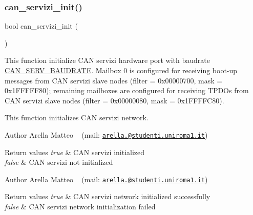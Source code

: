 \mbox{\label{group___c_a_n__servizi__group_ga2d29bd107e96ae1986e8874f004ffc84}} 
\subsubsection{\texorpdfstring{can\+\_\+servizi\+\_\+init()}{can\_servizi\_init()}}
{\footnotesize\ttfamily bool can\+\_\+servizi\+\_\+init (\begin{DoxyParamCaption}{ }\end{DoxyParamCaption})}



This function initialize C\+AN servizi hardware port with baudrate \mbox{\hyperlink{group___common__defines__group_ga2a5e84dfc7fa972b75e7ddbc6cc52a45}{C\+A\+N\+\_\+\+S\+E\+R\+V\+\_\+\+B\+A\+U\+D\+R\+A\+TE}}. Mailbox 0 is configured for receiving boot-\/up messages from C\+AN servizi slave nodes (filter = 0x00000700, mask = 0x1\+F\+F\+F\+F\+F80); remaining mailboxes are configured for receiving T\+P\+D\+Os from C\+AN servizi slave nodes (filter = 0x00000080, mask = 0x1\+F\+F\+F\+F\+C80). 

This function initializes C\+AN servizi network.

\begin{DoxyAuthor}{Author}
Arella Matteo ~\newline
 (mail\+: \href{mailto:arella.1646983@studenti.uniroma1.it}{\tt arella.@studenti.\+uniroma1.\+it})
\end{DoxyAuthor}

\begin{DoxyRetVals}{Return values}
{\em true} & C\+AN servizi initialized \\
\hline
{\em false} & C\+AN servizi not initialized\\
\hline
\end{DoxyRetVals}
\begin{DoxyAuthor}{Author}
Arella Matteo ~\newline
 (mail\+: \href{mailto:arella.1646983@studenti.uniroma1.it}{\tt arella.@studenti.\+uniroma1.\+it})
\end{DoxyAuthor}

\begin{DoxyRetVals}{Return values}
{\em true} & C\+AN servizi network initialized successfully \\
\hline
{\em false} & C\+AN servizi network initialization failed \\
\hline
\end{DoxyRetVals}


